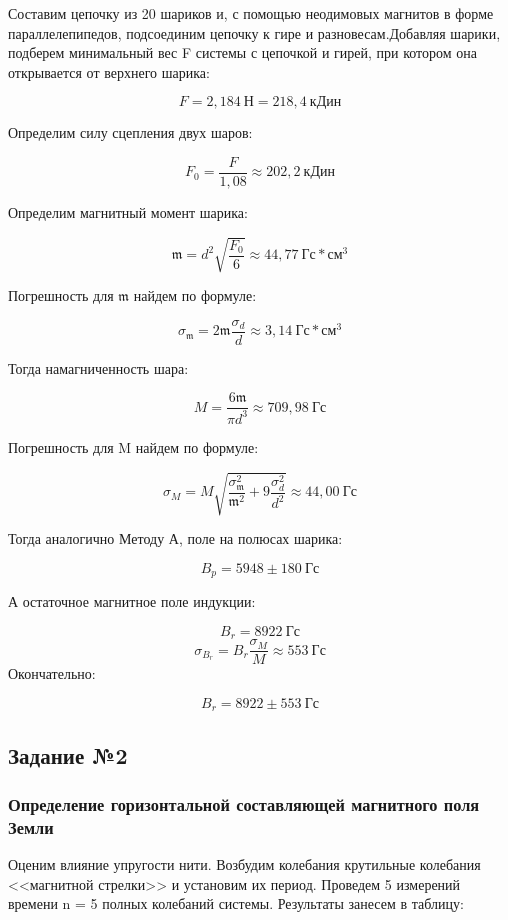 \documentclass[a4paper,12pt]{article}
\begin{document}
Составим цепочку из 20 шариков и, с помощью неодимовых магнитов в форме параллелепипедов, подсоединим цепочку к гире и разновесам.Добавляя шарики, подберем минимальный вес F системы с цепочкой и гирей, при котором она открывается от верхнего шарика:

$$
	F = 2,184 \ Н = 218,4 \ кДин
$$

Определим силу сцепления двух шаров:

$$
	F_0 = \frac{F}{1,08} \approx 202,2 \ кДин
$$

Определим магнитный момент шарика:

$$
\mathfrak{m} = d^2 \sqrt{\frac{F_0}{6}} \approx 44,77 \ Гс * см^3
$$

Погрешность для $\mathfrak{m}$ найдем по формуле:

$$
	\sigma_{\mathfrak{m}} = 2\mathfrak{m} \frac{\sigma_d}{d} \approx 3,14 \ Гс * см^3
$$

Тогда намагниченность шара:

$$
	M = \frac{6\mathfrak{m}}{\pi d^3} \approx 709,98 \ Гс	
$$

Погрешность для M найдем по формуле:

$$
	\sigma_M = M\sqrt{\frac{\sigma_{\mathfrak{m}}^2}{\mathfrak{m}^2} + 9\frac{\sigma_d^2}{d^2}} \approx 44,00 \ Гс
$$

Тогда аналогично Методу А, поле на полюсах шарика:

$$
	B_p = 5948 \pm 180 \ Гс
$$

А остаточное магнитное поле индукции:

$$
	B_r = 8922 \ Гс
$$
$$
	\sigma_{B_r} = B_r \frac{\sigma_M}{M} \approx 553 \ Гс
$$
Окончательно:

$$
	B_r = 8922 \pm 553 \ Гс
$$

\newpage

\subsection*{Задание №2}

\subsubsection*{Определение горизонтальной составляющей магнитного поля Земли}

Оценим влияние упругости нити. Возбудим колебания крутильные колебания <<магнитной стрелки>> и установим их период. Проведем 5 измерений времени n = 5 полных колебаний системы. Результаты занесем в таблицу: 
\end{document}
